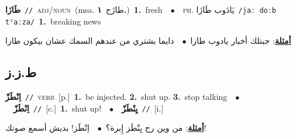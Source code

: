\documentclass[10pt,a4paper,twoside]{article} %
\begin{document}
\begin{multicols}{2}
{\setlength\topsep{0pt}\textbf{\foreignlanguage{arabic}{طَازَا}}\ {\color{gray}\texttt{//}\color{black}}\ \textsc{adj/noun}\ \color{gray}(msa. \foreignlanguage{arabic}{طازَج}~\foreignlanguage{arabic}{\textbf{١.}})\color{black}\ \textbf{1.}~fresh\ \ $\bullet$\ \ \textsc{ph.} \color{gray} \foreignlanguage{arabic}{يَادَوب طَازَا}\color{black}\ {\color{gray}\texttt{/{\sffamily jaː doːb tˤaːza}/}\color{black}}\ \textbf{1.}~breaking news\  \begin{flushright}\color{gray}\foreignlanguage{arabic}{\textbf{\underline{\foreignlanguage{arabic}{أمثلة}}}: جبتلك أخبار  يادوب طازا\ $\bullet$\ \  دايما بشتري من عندهم السمك عشان بيكون طازا}\end{flushright}\color{black}} \vspace{2mm}

\vspace{-3mm}
\subsection*{\color{blue}\foreignlanguage{arabic}{ط.ز.ز}\color{blue}{}} 

{\setlength\topsep{0pt}\textbf{\foreignlanguage{arabic}{اِنْطَزّ}}\ {\color{gray}\texttt{//}\color{black}}\ \textsc{verb}\ [p.]\ \textbf{1.}~be injected.  \textbf{2.}~shut up.  \textbf{3.}~stop talking\ \ $\bullet$\ \ \setlength\topsep{0pt}\textbf{\foreignlanguage{arabic}{اِنْطَزّ}}\ {\color{gray}\texttt{//}\color{black}}\ [c.]\ \textbf{1.}~shut up!\ \ $\bullet$\ \ \setlength\topsep{0pt}\textbf{\foreignlanguage{arabic}{يِنْطَزّ}}\ {\color{gray}\texttt{//}\color{black}}\ [i.]\  \begin{flushright}\color{gray}\foreignlanguage{arabic}{\textbf{\underline{\foreignlanguage{arabic}{أمثلة}}}: من وين رح يِنْطَز إِبرة؟\ $\bullet$\ \  اِنْطَز! بديش أسمع صوتك!}\end{flushright}\color{black}} \vspace{2mm}


\end{multicols}
\end{document}
